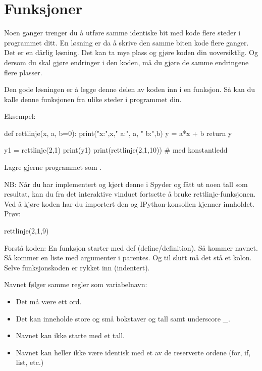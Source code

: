 \section{Funksjoner}
Noen ganger trenger du å utføre samme identiske bit med kode flere steder i programmet ditt. En løsning er da å skrive den samme biten kode flere ganger. Det er en dårlig løsning. Det kan ta mye plass og gjøre koden din uoversiktlig. Og dersom du skal gjøre endringer i den koden, må du gjøre de samme endringene flere plasser. 

Den gode løsningen er å legge denne delen av koden inn i en funksjon. Så kan du kalle denne funksjonen fra ulike steder i programmet din.

Eksempel:
\begin{usncodebox}
def rettlinje(x, a, b=0):
    print("x:",x,"  a:", a, "  b:",b)
    y = a*x + b
    return y
    
y1 = rettlinje(2,1)
print(y1)
print(rettlinje(2,1,10))   # med konstantledd
\end{usncodebox}

Lagre gjerne programmet som .

NB: Når du har implementert og kjørt denne i Spyder og fått ut noen tall som resultat, kan du fra det interaktive vinduet fortsette å bruke rettlinje-funksjonen. Ved å kjøre koden har du importert den og IPython-konsollen kjenner innholdet. 
Prøv:

\begin{usncodebox}
rettlinje(2,1,9) 
\end{usncodebox}

Forstå koden:
En funksjon starter med def (define/definition). Så kommer navnet. Så kommer en liste med argumenter i parentes. Og til slutt må det stå et kolon. Selve funksjonskoden er rykket inn (indentert).

Navnet følger samme regler som variabelnavn:
\begin{itemize}
\item Det må være ett ord.
\item Det kan inneholde store og små bokstaver og tall samt underscore \_.
\item Navnet kan ikke starte med et tall.
\item Navnet kan heller ikke være identisk med et av de reserverte ordene (for, if, list, etc.) 
\end{itemize}

